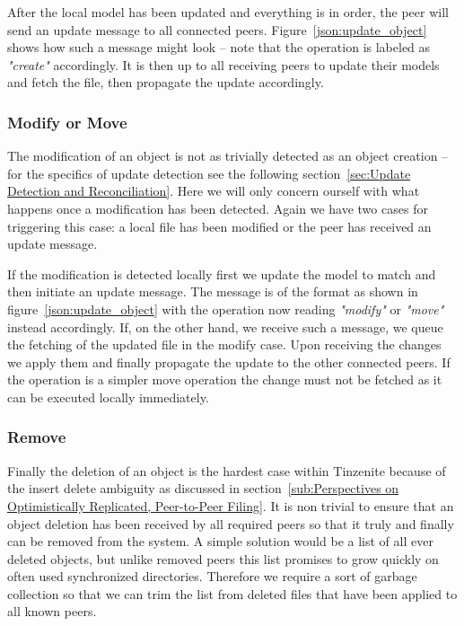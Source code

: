 After the local model has been updated and everything is in order, the peer will send an update message to all connected peers.
Figure~\ref{json:update_object} shows how such a message might look – note that the operation is labeled as \textit{"create"} accordingly.
It is then up to all receiving peers to update their models and fetch the file, then propagate the update accordingly.

\subsubsection{Modify or Move}
\label{subs:Modify or Move}

The modification of an object is not as trivially detected as an object creation – for the specifics of update detection see the following section~\ref{sec:Update Detection and Reconciliation}.
Here we will only concern ourself with what happens once a modification has been detected.
Again we have two cases for triggering this case: a local file has been modified or the peer has received an update message.

If the modification is detected locally first we update the model to match and then initiate an update message.
The message is of the format as shown in figure~\ref{json:update_object} with the operation now reading \textit{"modify"} or \textit{"move"} instead accordingly.
If, on the other hand, we receive such a message, we queue the fetching of the updated file in the modify case.
Upon receiving the changes we apply them and finally propagate the update to the other connected peers.
If the operation is a simpler move operation the change must not be fetched as it can be executed locally immediately.

\subsubsection{Remove}
\label{subs:Remove}

Finally the deletion of an object is the hardest case within Tinzenite because of the insert delete ambiguity as discussed in section~\ref{sub:Perspectives on Optimistically Replicated, Peer-to-Peer Filing}.
It is non trivial to ensure that an object deletion has been received by all required peers so that it truly and finally can be removed from the system.
A simple solution would be a list of all ever deleted objects, but unlike removed peers this list promises to grow quickly on often used synchronized directories.
Therefore we require a sort of garbage collection so that we can trim the list from deleted files that have been applied to all known peers.

